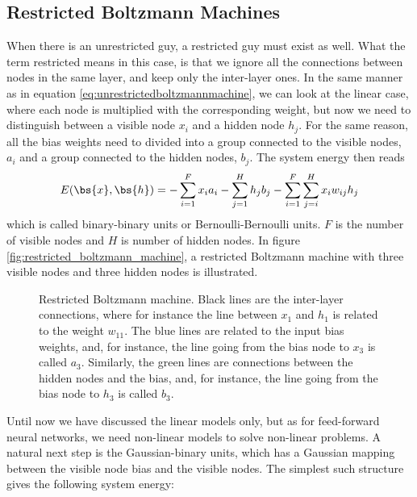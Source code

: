 \subsection{Restricted Boltzmann Machines}
When there is an unrestricted guy, a restricted guy must exist as well. What the term restricted means in this case, is that we ignore all the connections between nodes in the same layer, and keep only the inter-layer ones. In the same manner as in equation \eqref{eq:unrestrictedboltzmannmachine}, we can look at the linear case, where each node is multiplied with the corresponding weight, but now we need to distinguish between a visible node $x_i$ and a hidden node $h_j$. For the same reason, all the bias weights need to divided into a group connected to the visible nodes, $a_i$ and a group connected to the hidden nodes, $b_j$. The system energy then reads
\begin{equation}
E(\bs{x},\bs{h})=- \sum_{i=1}^Fx_ia_i- \sum_{j=1}^Hh_jb_j-\sum_{i=1}^F\sum_{j=i}^H x_iw_{ij}h_j 
\label{eq:binarybinary}
\end{equation}
which is called binary-binary units or Bernoulli-Bernoulli units. $F$ is the number of visible nodes and $H$ is number of hidden nodes. In figure \eqref{fig:restricted_boltzmann_machine}, a restricted Boltzmann machine with three visible nodes and three hidden nodes is illustrated.

\begin{figure} [H]
	\centering
	
	\caption{Restricted Boltzmann machine. Black lines are the inter-layer connections, where for instance the line between $x_1$ and $h_1$ is related to the weight $w_{11}$. The blue lines are related to the input bias weights, and, for instance, the line going from the bias node to $x_3$ is called $a_3$. Similarly, the green lines are connections between the hidden nodes and the bias, and, for instance, the line going from the bias node to $h_3$ is called $b_3$.}
	\label{fig:restricted_boltzmann_machine}
\end{figure}

Until now we have discussed the linear models only, but as for feed-forward neural networks, we need non-linear models to solve non-linear problems. A natural next step is the Gaussian-binary units, which has a Gaussian mapping between the visible node bias and the visible nodes. The simplest such structure gives the following system energy:

